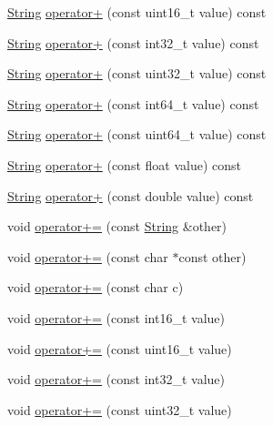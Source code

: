 \begin{DoxyCompactItemize}
\item 
\hyperlink{class_power_1_1_string}{String} \hyperlink{class_power_1_1_string_a6efb41ecb5b26be77e91fba85a286538}{operator+} (const uint16\+\_\+t value) const
\item 
\hyperlink{class_power_1_1_string}{String} \hyperlink{class_power_1_1_string_ac2eab190a121d5b7dc4431ea22966b7e}{operator+} (const int32\+\_\+t value) const
\item 
\hyperlink{class_power_1_1_string}{String} \hyperlink{class_power_1_1_string_afc7e926554a6e77bd4e34e850f08fa35}{operator+} (const uint32\+\_\+t value) const
\item 
\hyperlink{class_power_1_1_string}{String} \hyperlink{class_power_1_1_string_a6786c4c855394ed972fcee194f5b0b59}{operator+} (const int64\+\_\+t value) const
\item 
\hyperlink{class_power_1_1_string}{String} \hyperlink{class_power_1_1_string_aeff2ea13da477a4e313cdac2fcea1856}{operator+} (const uint64\+\_\+t value) const
\item 
\hyperlink{class_power_1_1_string}{String} \hyperlink{class_power_1_1_string_a011603e62e9254d7b2a95314ddaca716}{operator+} (const float value) const
\item 
\hyperlink{class_power_1_1_string}{String} \hyperlink{class_power_1_1_string_a0957d2856d8e5693a49fef4812629459}{operator+} (const double value) const
\item 
void \hyperlink{class_power_1_1_string_aad7a34466104387cc33cafcf04770b39}{operator+=} (const \hyperlink{class_power_1_1_string}{String} \&other)
\item 
void \hyperlink{class_power_1_1_string_a49e4abf34ef85a8d709aa0b6e37a283e}{operator+=} (const char $\ast$const other)
\item 
void \hyperlink{class_power_1_1_string_a52dac2961382313c2817ae2186d09a9e}{operator+=} (const char c)
\item 
void \hyperlink{class_power_1_1_string_a199f509027c45a73200cd8f6390953ca}{operator+=} (const int16\+\_\+t value)
\item 
void \hyperlink{class_power_1_1_string_a9fc5761dcad661b80d309656efc381d4}{operator+=} (const uint16\+\_\+t value)
\item 
void \hyperlink{class_power_1_1_string_a2e87aa213b473f2fd87da5563132d5b2}{operator+=} (const int32\+\_\+t value)
\item 
void \hyperlink{class_power_1_1_string_ad2fdb962fe7425c518e9fcc533fb3f55}{operator+=} (const uint32\+\_\+t value)
\item 

\end{DoxyCompactItemize}
